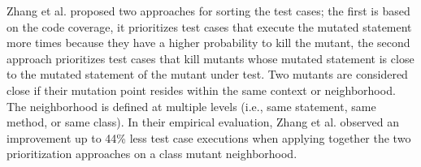 
Zhang et al. \cite{zhang2013faster} proposed two approaches for sorting the test cases; the first is based on the code coverage, it prioritizes test cases that execute the mutated statement more times because they have a higher probability to kill the mutant, 
the second approach prioritizes test cases that kill mutants whose mutated statement is close to the mutated statement of the mutant under test. Two mutants are considered close if their mutation point resides within the same context or neighborhood. The neighborhood is defined at multiple levels (i.e., same statement, same method, or same class).
In their empirical evaluation, Zhang et al. observed an improvement up to 44\% less test case executions when applying together the two prioritization approaches on a class mutant neighborhood. 



